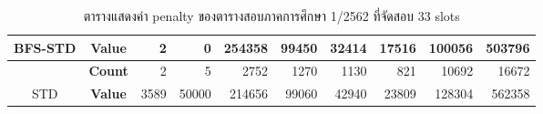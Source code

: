 \begin{table}[]
{\begin{tabular}{@{}ccrrrrrrrr@{}}
    \multirow{-2}{*}{BFS-STD}                    & \textbf{Value}                        & 2                              & 0                              & 254358                         & 99450                          & 32414                          & 17516                          & 100056                         & 503796                           \\ \midrule
                                                  & {\textbf{Count}} & {2}       & {5}       & {2752}    & {1270}    & {1130}    & {821}     & {10692}   & {16672}     \\ \cmidrule(l){2-10} 
    \multirow{-2}{*}{STD} & {\textbf{Value}} & {3589}    & {50000}   & {214656}  & {99060}   & {42940}   & {23809}   & {128304}  & {562358}    \\ \bottomrule
    \end{tabular}%
    }
    \caption{ตารางแสดงค่า penalty ของตารางสอบภาคการศึกษา 1/2562 ที่จัดสอบ 33 slots}
    \label{tab:result_table_162_33}
\end{table}
